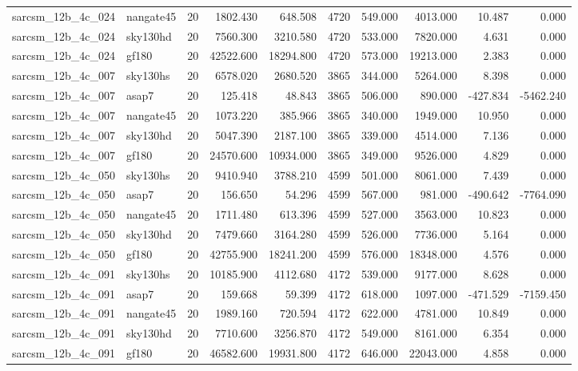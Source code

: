 \documentclass{article}
\begin{document}
\begin{longtable}{llrrrrrrrr}
sarcsm\_12b\_4c\_024 & nangate45 & 20 & 1802.430 & 648.508 & 4720 & 549.000 & 4013.000 & 10.487 & 0.000 \\
sarcsm\_12b\_4c\_024 & sky130hd & 20 & 7560.300 & 3210.580 & 4720 & 533.000 & 7820.000 & 4.631 & 0.000 \\
sarcsm\_12b\_4c\_024 & gf180 & 20 & 42522.600 & 18294.800 & 4720 & 573.000 & 19213.000 & 2.383 & 0.000 \\
sarcsm\_12b\_4c\_007 & sky130hs & 20 & 6578.020 & 2680.520 & 3865 & 344.000 & 5264.000 & 8.398 & 0.000 \\
sarcsm\_12b\_4c\_007 & asap7 & 20 & 125.418 & 48.843 & 3865 & 506.000 & 890.000 & -427.834 & -5462.240 \\
sarcsm\_12b\_4c\_007 & nangate45 & 20 & 1073.220 & 385.966 & 3865 & 340.000 & 1949.000 & 10.950 & 0.000 \\
sarcsm\_12b\_4c\_007 & sky130hd & 20 & 5047.390 & 2187.100 & 3865 & 339.000 & 4514.000 & 7.136 & 0.000 \\
sarcsm\_12b\_4c\_007 & gf180 & 20 & 24570.600 & 10934.000 & 3865 & 349.000 & 9526.000 & 4.829 & 0.000 \\
sarcsm\_12b\_4c\_050 & sky130hs & 20 & 9410.940 & 3788.210 & 4599 & 501.000 & 8061.000 & 7.439 & 0.000 \\
sarcsm\_12b\_4c\_050 & asap7 & 20 & 156.650 & 54.296 & 4599 & 567.000 & 981.000 & -490.642 & -7764.090 \\
sarcsm\_12b\_4c\_050 & nangate45 & 20 & 1711.480 & 613.396 & 4599 & 527.000 & 3563.000 & 10.823 & 0.000 \\
sarcsm\_12b\_4c\_050 & sky130hd & 20 & 7479.660 & 3164.280 & 4599 & 526.000 & 7736.000 & 5.164 & 0.000 \\
sarcsm\_12b\_4c\_050 & gf180 & 20 & 42755.900 & 18241.200 & 4599 & 576.000 & 18348.000 & 4.576 & 0.000 \\
sarcsm\_12b\_4c\_091 & sky130hs & 20 & 10185.900 & 4112.680 & 4172 & 539.000 & 9177.000 & 8.628 & 0.000 \\
sarcsm\_12b\_4c\_091 & asap7 & 20 & 159.668 & 59.399 & 4172 & 618.000 & 1097.000 & -471.529 & -7159.450 \\
sarcsm\_12b\_4c\_091 & nangate45 & 20 & 1989.160 & 720.594 & 4172 & 622.000 & 4781.000 & 10.849 & 0.000 \\
sarcsm\_12b\_4c\_091 & sky130hd & 20 & 7710.600 & 3256.870 & 4172 & 549.000 & 8161.000 & 6.354 & 0.000 \\
sarcsm\_12b\_4c\_091 & gf180 & 20 & 46582.600 & 19931.800 & 4172 & 646.000 & 22043.000 & 4.858 & 0.000 \\

\end{longtable}
\end{document}
